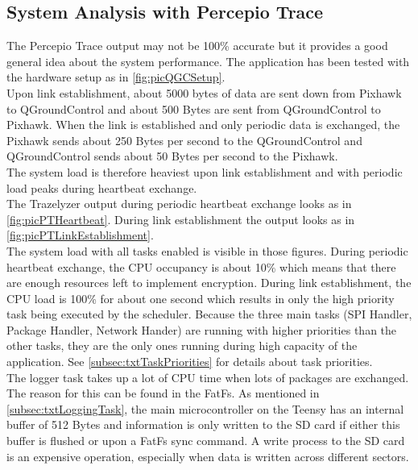 \subsection{System Analysis with Percepio Trace} \label{subsec:txtPTSystemAnalysis}
The Percepio Trace output may not be 100\% accurate but it provides a good general idea about the system performance. The application has been tested with the hardware setup as in \autoref{fig:picQGCSetup}.\\
Upon link establishment, about 5000 bytes of data are sent down from Pixhawk to QGroundControl and about 500 Bytes are sent from QGroundControl to Pixhawk. When the link is established and only periodic data is exchanged, the Pixhawk sends about 250 Bytes per second to the QGroundControl and QGroundControl sends about 50 Bytes per second to the Pixhawk.\\
The system load is therefore heaviest upon link establishment and with periodic load peaks during heartbeat exchange.\\
The Trazelyzer output during periodic heartbeat exchange looks as in \autoref{fig:picPTHeartbeat}. During link establishment the output looks as in \autoref{fig:picPTLinkEstablishment}.\\
The system load with all tasks enabled is visible in those figures. During periodic heartbeat exchange, the CPU occupancy is about 10\% which means that there are enough resources left to implement encryption. During link establishment, the CPU load is 100\% for about one second which results in only the high priority task being executed by the scheduler. Because the three main tasks (SPI Handler, Package Handler, Network Hander) are running with higher priorities than the other tasks, they are the only ones running during high capacity of the application. See \autoref{subsec:txtTaskPriorities} for details about task priorities.\\
The logger task takes up a lot of CPU time when lots of packages are exchanged. The reason for this can be found in the FatFs. As mentioned in \autoref{subsec:txtLoggingTask}, the main microcontroller on the Teensy has an internal buffer of 512 Bytes and information is only written to the SD card if either this buffer is flushed or upon a FatFs sync command. A write process to the SD card is an expensive operation, especially when data is written across different sectors.
